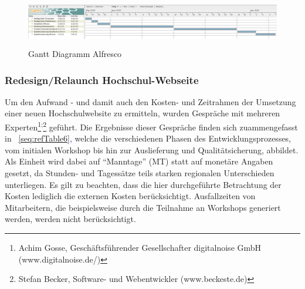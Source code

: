 \documentclass[a4paper]{article}
\begin{document}
\begin{figure}
\centering
\includegraphics[width=15.501cm,height=2.129cm]{INMAusarbeitung02-img011.png}
\caption[Gantt Diagramm Alfresco]{Gantt Diagramm Alfresco}
\label{seq:refIllustration10}

\end{figure}
\subsubsection[Redesign/Relaunch Hochschul{}-Webseite]{\color{black} Redesign/Relaunch Hochschul-Webseite}
\label{bkm:RefHeading24771162299686}{\sffamily
Um den Aufwand - und damit auch den Kosten- und Zeitrahmen der Umsetzung einer neuen Hochschulwebsite zu ermitteln,
wurden Gespräche mit mehreren Experten\footnote{Achim Gosse, Geschäftsführender Gesellschafter digitalnoise GmbH
(www.digitalnoise.de/)}\textsuperscript{;}\footnote{Stefan Becker, Software- und Webentwickler (www.beckeste.de)}
geführt. Die Ergebnisse dieser Gespräche finden sich zuammengefasst in \tablename~\ref{seq:refTable6}\textcolor{blue}{,
}welche\textcolor{blue}{ }die verschiedenen Phasen des Entwicklungsprozesses, vom initialen Workshop bis hin zur
Auslieferung und Qualitätsicherung, abbildet. Als Einheit wird dabei auf “Manntage” (MT) statt auf monetäre Angaben
gesetzt, da Stunden- und Tagessätze teils starken regionalen Unterschieden unterliegen. Es gilt zu beachten, dass die
hier durchgeführte Betrachtung der Kosten lediglich die externen Kosten berücksichtigt. Ausfallzeiten von Mitarbeitern,
die beispielsweise durch die Teilnahme an Workshops generiert werden, werden nicht berücksichtigt.}


\bigskip
\end{document}
